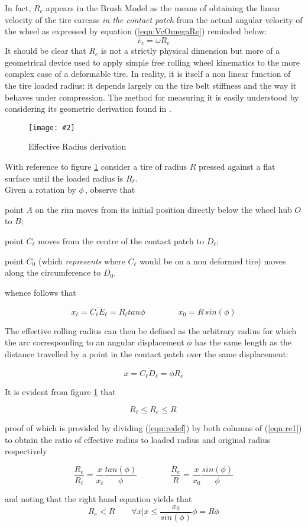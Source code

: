 \documentclass[12pt,a4paper]{report}
\newcommand{\figura}[5][htbp]{
\begin{figure}[#1]
\begin{center}
\texttt{[image: \#2]}
\caption{#4}\label{#5}
\end{center}
\end{figure}
}
\newcommand{\eq}[2]{
\begin{equation} \label{#1}
#2
\end{equation}
}
\newcommand{\req}[1]{
(\ref{#1})
}
\begin{document}
In fact, $R_e$ appears in the Brush Model as the means of obtaining  the linear velocity of the tire carcass \emph{in the contact patch} from the actual angular velocity of the wheel as expressed by equation \req{eqn:VcOmegaRe} reminded below:
$$ \bar{v}_c=\omega R_e $$
It should be clear that $R_e$ is not a strictly physical dimension but more of a geometrical device used to apply simple free rolling wheel kinematics to the more complex case of a deformable tire.
In reality, it is itself a non linear function of the tire loaded radius: it depends largely on the tire belt stiffness and the way it behaves under compression.
The method for measuring it is easily understood by considering its geometric derivation found in \cite{Misset}.

\figura{pix/effective_rolling_radius.jpg}{width=14cm}{Effective Radius derivation}{fig:re1}
With reference to figure \ref{fig:re1} consider a tire of radius $R$ pressed against a flat surface until the loaded radius is $R_\ell$.\\
Given a rotation by $\phi \,$, observe that
\begin{description}
\item point $A$ on the rim moves from its initial position directly below the wheel hub $O$ to $B$;
\item point $C_\ell$ moves from the centre of the contact patch to $D_\ell$;
\item point $C_0$ (which \emph{represents} where $C_\ell$ would be on a non deformed tire) moves along the circumference to $D_0$.
\end{description}
whence follows that
\eq{eqn:re1}{x_\ell =\overline{C_\ell E_\ell} =  R_\ell tan\phi \qquad \qquad x_0 = R\, sin(\phi)}
The effective rolling radius can then be defined as the arbitrary radius for which the arc corresponding to an angular displacement $\phi$ has the same length as the distance travelled by a point in the contact patch over the same displacement:
\eq{eqn:redef}{x =\overline{C_\ell D_\ell} = \phi R_e }
It is evident from figure \ref{fig:re1} that 
\eq{eqn:relims}{R_\ell \leqslant R_e \leqslant R \,}
proof of which is provided by dividing \req{eqn:redef} by both columns of \req{eqn:re1} to obtain the ratio of effective radius to loaded radius and original radius respectively
\eq{eqn:reratios}{\frac{R_e}{R_\ell} = \frac{x}{x_\ell} \frac{tan(\phi)}{\phi} \qquad \qquad \frac{R_e}{R} = \frac{x}{x_0} \frac{sin(\phi)}{\phi}}
and noting that the right hand equation yields that
$$
R_e < R \qquad \forall x | x \leqslant \frac{x_0}{sin(\phi)} \phi = R \phi
$$
\end{document}
